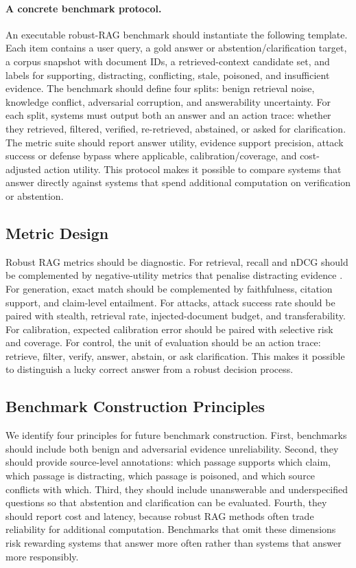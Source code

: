 \paragraph{A concrete benchmark protocol.}
An executable robust-RAG benchmark should instantiate the following template. Each item contains a user query, a gold answer or abstention/clarification target, a corpus snapshot with document IDs, a retrieved-context candidate set, and labels for supporting, distracting, conflicting, stale, poisoned, and insufficient evidence. The benchmark should define four splits: benign retrieval noise, knowledge conflict, adversarial corruption, and answerability uncertainty. For each split, systems must output both an answer and an action trace: whether they retrieved, filtered, verified, re-retrieved, abstained, or asked for clarification. The metric suite should report answer utility, evidence support precision, attack success or defense bypass where applicable, calibration/coverage, and cost-adjusted action utility. This protocol makes it possible to compare systems that answer directly against systems that spend additional computation on verification or abstention.

\subsection{Metric Design}

Robust RAG metrics should be diagnostic. For retrieval, recall and nDCG should be complemented by negative-utility metrics that penalise distracting evidence \citep{rrag058}. For generation, exact match should be complemented by faithfulness, citation support, and claim-level entailment. For attacks, attack success rate should be paired with stealth, retrieval rate, injected-document budget, and transferability. For calibration, expected calibration error should be paired with selective risk and coverage. For control, the unit of evaluation should be an action trace: retrieve, filter, verify, answer, abstain, or ask clarification. This makes it possible to distinguish a lucky correct answer from a robust decision process.

\subsection{Benchmark Construction Principles}

We identify four principles for future benchmark construction. First, benchmarks should include both benign and adversarial evidence unreliability. Second, they should provide source-level annotations: which passage supports which claim, which passage is distracting, which passage is poisoned, and which source conflicts with which. Third, they should include unanswerable and underspecified questions so that abstention and clarification can be evaluated. Fourth, they should report cost and latency, because robust RAG methods often trade reliability for additional computation. Benchmarks that omit these dimensions risk rewarding systems that answer more often rather than systems that answer more responsibly.
